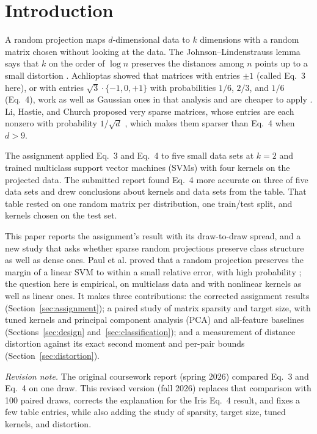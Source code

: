 \section{Introduction}

A random projection maps $d$-dimensional data to $k$ dimensions with a random matrix chosen without looking at the data. The Johnson--Lindenstrauss lemma says that $k$ on the order of $\log n$ preserves the distances among $n$ points up to a small distortion \cite{johnson1984,dasgupta2003}. Achlioptas showed that matrices with entries $\pm 1$ (called Eq.~3 here), or with entries $\sqrt{3}\cdot\{-1, 0, +1\}$ with probabilities $1/6$, $2/3$, and $1/6$ (Eq.~4), work as well as Gaussian ones in that analysis and are cheaper to apply \cite{achlioptas2003}. Li, Hastie, and Church proposed very sparse matrices, whose entries are each nonzero with probability $1/\sqrt{d}$ \cite{li2006}, which makes them sparser than Eq.~4 when $d > 9$.

The assignment applied Eq.~3 and Eq.~4 to five small data sets at $k = 2$ and trained multiclass support vector machines (SVMs) with four kernels on the projected data. The submitted report found Eq.~4 more accurate on three of five data sets and drew conclusions about kernels and data sets from the table. That table rested on one random matrix per distribution, one train/test split, and kernels chosen on the test set.

This paper reports the assignment's result with its draw-to-draw spread, and a new study that asks whether sparse random projections preserve class structure as well as dense ones. Paul et al. proved that a random projection preserves the margin of a linear SVM to within a small relative error, with high probability \cite{paul2013}; the question here is empirical, on multiclass data and with nonlinear kernels as well as linear ones. It makes three contributions: the corrected assignment results (Section~\ref{sec:assignment}); a paired study of matrix sparsity and target size, with tuned kernels and principal component analysis (PCA) and all-feature baselines (Sections~\ref{sec:design} and~\ref{sec:classification}); and a measurement of distance distortion against its exact second moment and per-pair bounds (Section~\ref{sec:distortion}).

\emph{Revision note.} The original coursework report (spring 2026) compared Eq.~3 and Eq.~4 on one draw. This revised version (fall 2026) replaces that comparison with 100 paired draws, corrects the explanation for the Iris Eq.~4 result, and fixes a few table entries, while also adding the study of sparsity, target size, tuned kernels, and distortion.
